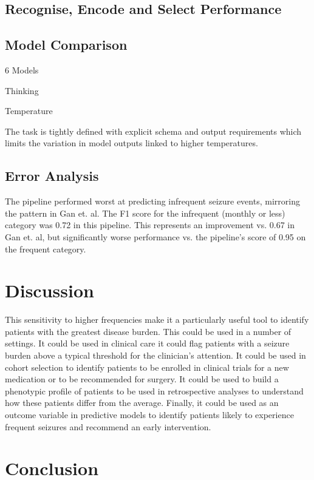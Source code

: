 \documentclass[conference]{IEEEtran}
\begin{document}
\subsection{Recognise, Encode and Select Performance}


\subsection{Model Comparison}

6 Models

Thinking 

Temperature

The task is tightly defined with explicit schema and output 
requirements which limits the variation in model outputs 
linked to higher temperatures.

\subsection{Error Analysis}

The pipeline performed worst at predicting infrequent 
seizure events, mirroring the pattern in Gan et. al. The F1 
score for the infrequent (monthly or less) category was 
0.72 in this pipeline. This represents an improvement vs. 
0.67 in Gan et. al, but significantly worse performance 
vs. the pipeline's score of 0.95 on the frequent category. 


\section{Discussion}

This sensitivity to higher frequencies make it a particularly 
useful tool to identify patients with the greatest disease 
burden. This could be used in a number of settings. It could
be used in clinical care it could flag patients with a seizure 
burden above a typical threshold for the clinician's attention. 
It could be used in cohort selection to identify patients to be 
enrolled in clinical trials for a new medication or to be 
recommended for surgery. It could be used to build a 
phenotypic profile of patients to be used in retrospective 
analyses to understand how these patients differ from the 
average. Finally, it could be used as an outcome variable in 
predictive models to identify patients likely to experience 
frequent seizures and recommend an early intervention. 

\section{Conclusion}
\end{document}
